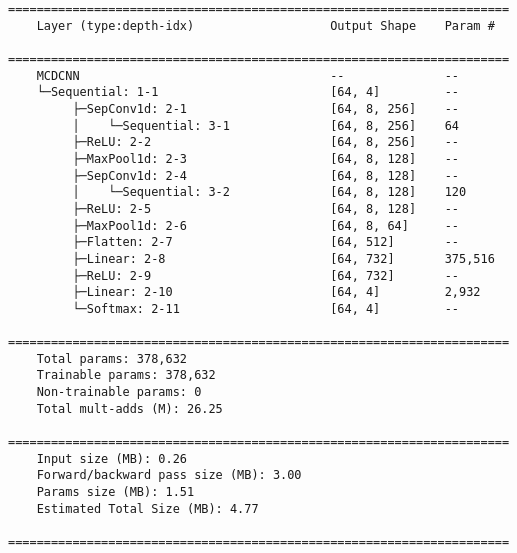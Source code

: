 \newpage
\begin{lstlisting}[caption=\acrfull{mcdcnn}]
    ======================================================================
    Layer (type:depth-idx)                   Output Shape    Param #
    ======================================================================
    MCDCNN                                   --              --
    └─Sequential: 1-1                        [64, 4]         --
         ├─SepConv1d: 2-1                    [64, 8, 256]    --
         │    └─Sequential: 3-1              [64, 8, 256]    64
         ├─ReLU: 2-2                         [64, 8, 256]    --
         ├─MaxPool1d: 2-3                    [64, 8, 128]    --
         ├─SepConv1d: 2-4                    [64, 8, 128]    --
         │    └─Sequential: 3-2              [64, 8, 128]    120
         ├─ReLU: 2-5                         [64, 8, 128]    --
         ├─MaxPool1d: 2-6                    [64, 8, 64]     --
         ├─Flatten: 2-7                      [64, 512]       --
         ├─Linear: 2-8                       [64, 732]       375,516
         ├─ReLU: 2-9                         [64, 732]       --
         ├─Linear: 2-10                      [64, 4]         2,932
         └─Softmax: 2-11                     [64, 4]         --
    ======================================================================
    Total params: 378,632
    Trainable params: 378,632
    Non-trainable params: 0
    Total mult-adds (M): 26.25
    ======================================================================
    Input size (MB): 0.26
    Forward/backward pass size (MB): 3.00
    Params size (MB): 1.51
    Estimated Total Size (MB): 4.77
    ======================================================================
\end{lstlisting}

